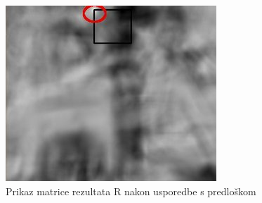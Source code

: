 \begin{figure}[h]
\centering
\includegraphics[scale=0.8]{figures/tm3.jpg}
\caption{Prikaz matrice rezultata R nakon usporedbe s predloškom}
\label{fig:tm3.jpg}
\end{figure}

